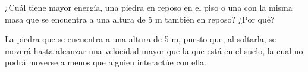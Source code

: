 ¿Cuál tiene mayor energía, una piedra en reposo en el piso o una con
la misma masa que se encuentra a una altura de 5 m también en reposo? ¿Por qué?


\begin{solutionbox}{2cm}
    La piedra que se encuentra a una altura de 5 m, puesto que, al soltarla, se
    moverá hasta alcanzar una velocidad mayor que la que está en el suelo, la
    cual no podrá moverse a menos que alguien interactúe con ella.
\end{solutionbox}
